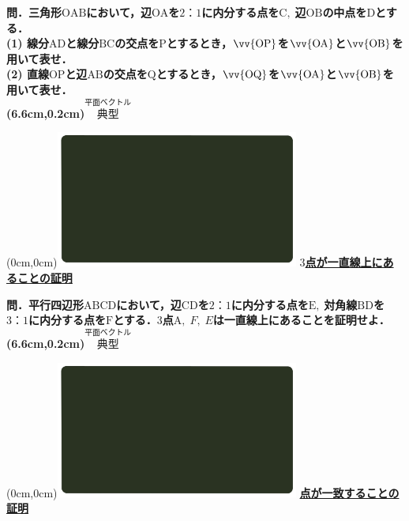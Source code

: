 \documentclass[10pt,
fleqn,
dvipdfmx,
uplatex
]{jsarticle}
\begin{document}
\small 
\bf\boldmath 問．三角形$\text{OAB}$において，辺$\text{OA}$を$2：1$に内分する点を$\text{C},\;$辺$\text{OB}$の中点を$\text{D}$とする．\\
(1)  線分$\text{AD}$と線分$\text{BC}$の交点を$\text{P}$とするとき，$\vv{\text{OP}}$を$\vv{\text{OA}}$と$\vv{\text{OB}}$を用いて表せ．\\
(2)  直線$\text{OP}$と辺$\text{AB}$の交点を$\text{Q}$とするとき，$\vv{\text{OQ}}$を$\vv{\text{OA}}$と$\vv{\text{OB}}$を用いて表せ．\\

\at(6.6cm,0.2cm){\small\color{bradorange}$\overset{\text{平面ベクトル}}{\text{典型}}$}


\newpage



\at(0cm,0cm){\includegraphics[width=8cm,bb=0 0 1920 1080]{./youtube/thumbnails/templates/smart_background/平面ベクトル.jpeg}}
{\color{orange}\bf\boldmath\Large\underline{$3$点が一直線上にあることの証明}}\vspace{0.3zw}

\Large 
\bf\boldmath 問．平行四辺形$\text{ABCD}$において，辺$\text{CD}$を$2：1$に内分する点を$\text{E},\;$対角線$\text{BD}$を$3：1$に内分する点を$\text{F}$とする．$3$点$\text{A},\;F,\;E$は一直線上にあることを証明せよ．
\at(6.6cm,0.2cm){\small\color{bradorange}$\overset{\text{平面ベクトル}}{\text{典型}}$}


\newpage



\at(0cm,0cm){\includegraphics[width=8cm,bb=0 0 1920 1080]{./youtube/thumbnails/templates/smart_background/平面ベクトル.jpeg}}
{\color{orange}\bf\boldmath\LARGE\underline{点が一致することの証明}}\vspace{0.3zw}
\end{document}
